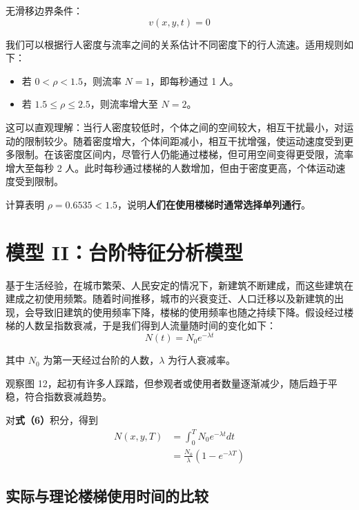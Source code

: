 \documentclass[11pt,a4paper]{ctexart}
\begin{document}
无滑移边界条件：
\begin{equation}
v(x,y,t)=0\tag{8}
\end{equation}

我们可以根据行人密度与流率之间的关系估计不同密度下的行人流速\cite{ref6}。适用规则如下：

\begin{itemize}[leftmargin=2em,itemsep=2pt,topsep=2pt]
\item 若 $0<\rho<1.5$，则流率 $N=1$，即每秒通过 1 人。
\item 若 $1.5\leq\rho\leq 2.5$，则流率增大至 $N=2$。
\end{itemize}

这可以直观理解：当行人密度较低时，个体之间的空间较大，相互干扰最小，对运动的限制较少。随着密度增大，个体间距减小，相互干扰增强，使运动速度受到更多限制。在该密度区间内，尽管行人仍能通过楼梯，但可用空间变得更受限，流率增大至每秒 2 人。此时每秒通过楼梯的人数增加，但由于密度更高，个体运动速度受到限制。

计算表明 $\rho=0.6535<1.5$，说明\textbf{人们在使用楼梯时通常选择单列通行}。

\section{模型 II：台阶特征分析模型}

基于生活经验，在城市繁荣、人民安定的情况下，新建筑不断建成，而这些建筑在建成之初使用频繁。随着时间推移，城市的兴衰变迁、人口迁移以及新建筑的出现，会导致旧建筑的使用频率下降，楼梯的使用频率也随之持续下降。假设经过楼梯的人数呈指数衰减，于是我们得到人流量随时间的变化如下：
\begin{equation}
N(t)=N_0e^{-\lambda t}\tag{9}
\end{equation}

其中 $N_0$ 为第一天经过台阶的人数，$\lambda$ 为行人衰减率。

观察图 12，起初有许多人踩踏，但参观者或使用者数量逐渐减少，随后趋于平稳，符合指数衰减趋势。

对\textbf{式（6）}积分，得到
\begin{equation}
\begin{aligned}
N(x,y,T)&=\int_0^{T}N_0e^{-\lambda t}dt\\
&=\frac{N_0}{\lambda}\left(1-e^{-\lambda T}\right)
\end{aligned}\tag{10}
\end{equation}

\subsection{实际与理论楼梯使用时间的比较}
\end{document}

